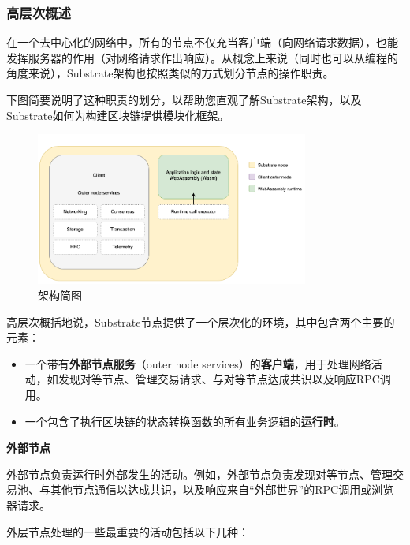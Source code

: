 \hypertarget{ux9ad8ux5c42ux6b21ux6982ux8ff0}{%
\subsubsection{高层次概述}\label{ux9ad8ux5c42ux6b21ux6982ux8ff0}}

在一个去中心化的网络中，所有的节点不仅充当客户端（向网络请求数据），也能发挥服务器的作用（对网络请求作出响应）。从概念上来说（同时也可以从编程的角度来说），Substrate架构也按照类似的方式划分节点的操作职责。

下图简要说明了这种职责的划分，以帮助您直观了解Substrate架构，以及Substrate如何为构建区块链提供模块化框架。

\begin{figure}[htbp]
  \centering
  \includegraphics[width=0.8\textwidth]{images/simplified-architecture.png}
  \caption{架构简图}\label{架构简图} %
\end{figure}

高层次概括地说，Substrate节点提供了一个层次化的环境，其中包含两个主要的元素：

\begin{itemize}
\item
  一个带有\textbf{外部节点服务}（outer node
  services）的\textbf{客户端}，用于处理网络活动，如发现对等节点、管理交易请求、与对等节点达成共识以及响应RPC调用。
\item
  一个包含了执行区块链的状态转换函数的所有业务逻辑的\textbf{运行时}。
\end{itemize}

\hypertarget{ux5916ux90e8ux8282ux70b9}{%
\textbf{外部节点}\label{ux5916ux90e8ux8282ux70b9}}

外部节点负责运行时外部发生的活动。例如，外部节点负责发现对等节点、管理交易池、与其他节点通信以达成共识，以及响应来自``外部世界''的RPC调用或浏览器请求。

外层节点处理的一些最重要的活动包括以下几种：

